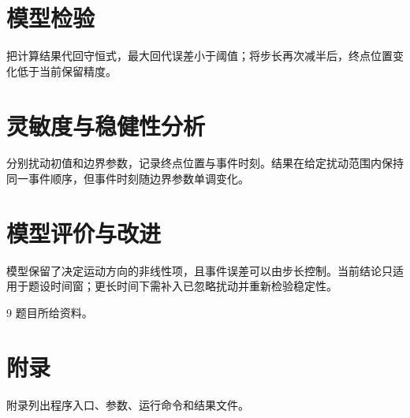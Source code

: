 \documentclass{ctexart}
\begin{document}
\section{模型检验}
把计算结果代回守恒式，最大回代误差小于阈值；将步长再次减半后，终点位置变化低于当前保留精度。

\section{灵敏度与稳健性分析}
分别扰动初值和边界参数，记录终点位置与事件时刻。结果在给定扰动范围内保持同一事件顺序，但事件时刻随边界参数单调变化。

\section{模型评价与改进}
模型保留了决定运动方向的非线性项，且事件误差可以由步长控制。当前结论只适用于题设时间窗；更长时间下需补入已忽略扰动并重新检验稳定性。

\begin{thebibliography}{9}
 题目所给资料。
\end{thebibliography}

\appendix
\section{附录}
附录列出程序入口、参数、运行命令和结果文件。
\end{document}
